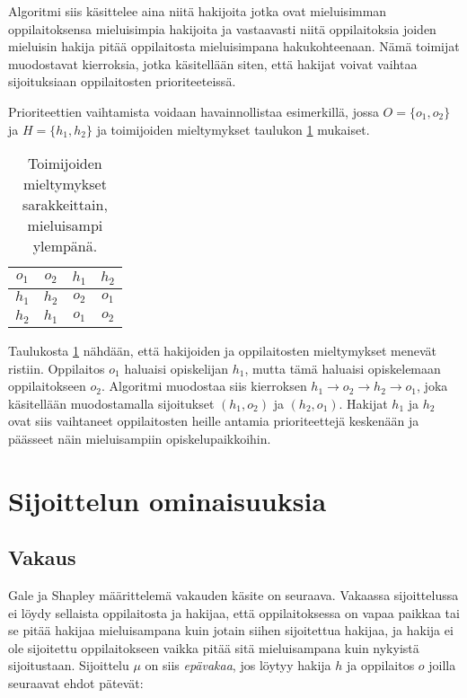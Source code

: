 \documentclass[gradu, twoside]{tktltiki}
\begin{document}
Algoritmi siis käsittelee aina niitä hakijoita jotka ovat mieluisimman
oppilaitoksensa mieluisimpia hakijoita ja vastaavasti niitä
oppilaitoksia joiden mieluisin hakija pitää oppilaitosta mieluisimpana
hakukohteenaan. Nämä toimijat muodostavat kierroksia, jotka
käsitellään siten, että hakijat voivat vaihtaa sijoituksiaan
oppilaitosten prioriteeteissä.

Prioriteettien vaihtamista voidaan havainnollistaa esimerkillä, jossa
$O = \{o_1, o_2\}$ ja $H = \{h_1, h_2\}$ ja toimijoiden mieltymykset
taulukon \ref{top_esimerkki} mukaiset.

\begin{table}[ht]
  \begin{center}
    \begin{tabular}{ c c | c c }
    $o_1$ & $o_2$ & $h_1$ & $h_2$ \\
    \hline
    $h_1$ & $h_2$ & $o_2$ & $o_1$ \\
    $h_2$ & $h_1$ & $o_1$ & $o_2$
    \end{tabular}
    \caption{Toimijoiden mieltymykset sarakkeittain, mieluisampi ylempänä.}
    \label{top_esimerkki}
  \end{center}
\end{table}

Taulukosta \ref{top_esimerkki} nähdään, että hakijoiden ja
oppilaitosten mieltymykset menevät ristiin. Oppilaitos $o_1$ haluaisi
opiskelijan $h_1$, mutta tämä haluaisi opiskelemaan oppilaitokseen
$o_2$. Algoritmi muodostaa siis kierroksen $h_1 \rightarrow o_2
\rightarrow h_2 \rightarrow o_1$, joka käsitellään muodostamalla
sijoitukset $(h_1, o_2)$ ja $(h_2, o_1)$. Hakijat $h_1$ ja $h_2$ ovat
siis vaihtaneet oppilaitosten heille antamia prioriteettejä keskenään
ja päässeet näin mieluisampiin opiskelupaikkoihin.

\section{Sijoittelun ominaisuuksia}
\label{ominaisuus_luku}
\subsection{Vakaus}

Gale ja Shapley määrittelemä vakauden käsite \cite{galeshapley62} on
seuraava. Vakaassa sijoittelussa ei löydy sellaista oppilaitosta ja
hakijaa, että oppilaitoksessa on vapaa paikkaa tai se pitää hakijaa
mieluisampana kuin jotain siihen sijoitettua hakijaa, ja hakija ei ole
sijoitettu oppilaitokseen vaikka pitää sitä mieluisampana kuin
nykyistä sijoitustaan. Sijoittelu $\mu$ on siis \emph{epävakaa}, jos
löytyy hakija $h$ ja oppilaitos $o$ joilla seuraavat ehdot pätevät:
\end{document}
